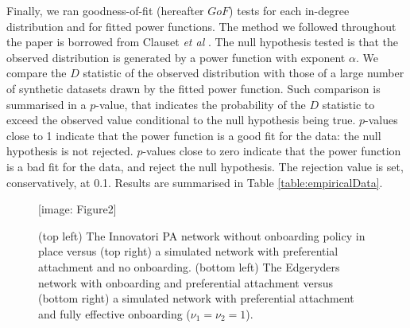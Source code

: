 \documentclass{bmcart}
\def\texttt{[image: ]}
\begin{document}

Finally, we ran goodness-of-fit (hereafter $GoF$) tests for each in-degree distribution and for fitted power functions. The method we followed throughout the paper is borrowed from Clauset \emph{et al} \cite{clauset2009power}. The null hypothesis tested is that the observed distribution is generated by a power function with exponent $\alpha$. We compare the $D$ statistic of the observed distribution with those of a large number of synthetic datasets drawn by the fitted power function. Such comparison is summarised in a $p$-value, that indicates the probability of the $D$ statistic to exceed the observed value conditional to the null hypothesis being true. $p$-values close to 1 indicate that the power function is a good fit for the data: the null hypothesis is not rejected. $p$-values close to zero indicate that the power function is a bad fit for the data, and reject the null hypothesis. The rejection value is set, conservatively, at 0.1. Results are summarised in Table \ref{table:empiricalData}. 
	

\begin{figure}[h!]
\texttt{[image: Figure2]}
\caption{
(top left) The Innovatori PA network without onboarding policy in place versus (top right) a simulated network with preferential attachment and no onboarding.
(bottom left) The Edgeryders network with onboarding and preferential attachment versus (bottom right) a simulated network with preferential attachment and fully effective onboarding ($\nu_1 = \nu_2 = 1$).}
\label{fig:PDFViz}
\end{figure}

\end{document}
